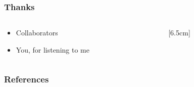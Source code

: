 \documentclass[aspectratio=169]{beamer}
\begin{document}
\begin{frame}
	\frametitle{Thanks}
	\begin{columns}
		\begin{column}{0.495\linewidth}
			\begin{itemize}
				\item Collaborators
				\item<2-> You, for listening to me%
			\end{itemize}%
	\end{column}
	\begin{column}{0.495\linewidth}
		[6.5cm]
		\end{column}
	\end{columns}
\end{frame}

\begin{frame}
	\frametitle{References}
	\printbibliography
\end{frame}
\end{document}
